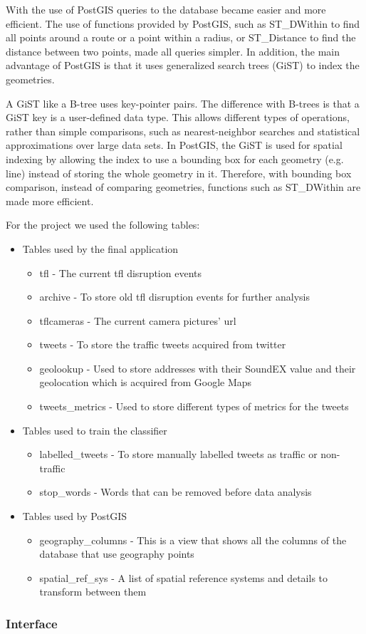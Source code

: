 With the use of PostGIS queries to the database became easier and more efficient. The use of functions provided by PostGIS, such as ST_DWithin to find all points around a route or a point within a radius, or ST_Distance to find the distance between two points, made all queries simpler. In addition, the main advantage of PostGIS is that it uses generalized search trees (GiST) to index the geometries. 

A GiST like a B-tree uses key-pointer pairs. The difference with B-trees is that a GiST key is a user-defined data type. This allows different types of operations, rather than simple comparisons, such as nearest-neighbor searches and statistical approximations over large data sets. In PostGIS, the GiST is used for spatial indexing by allowing the index to use a bounding box for each geometry (e.g. line) instead of storing the whole geometry in it. Therefore, with bounding box comparison, instead of comparing geometries, functions such as ST_DWithin are made more efficient.

For the project we used the following tables:
\begin{itemize}
\item Tables used by the final application
  \begin{itemize}
  \item tfl - The current tfl disruption events
  \item archive - To store old tfl disruption events for further analysis
  \item tflcameras - The current camera pictures' url
  \item tweets - To store the traffic tweets acquired from twitter
  \item geolookup - Used to store addresses with their SoundEX value and their geolocation which is acquired from Google Maps
  \item tweets_metrics - Used to store different types of metrics for the tweets
  \end{itemize}
\item Tables used to train the classifier
  \begin{itemize}
  \item labelled_tweets - To store manually labelled tweets as traffic or non-traffic
  \item stop_words - Words that can be removed before data analysis
  \end{itemize}
\item Tables used by PostGIS
  \begin{itemize}
  \item geography_columns - This is a view that shows all the columns of the database that use geography points
  \item spatial_ref_sys - A list of spatial reference systems and details to transform between them
  \end{itemize}
\end{itemize}
\subsubsection{Interface}

